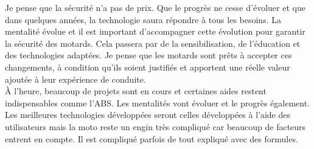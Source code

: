 
Je pense que la sécurité n'a pas de prix. Que le progrès ne cesse d'évoluer et que dans quelques années, la technologie saura répondre à tous les besoins. La mentalité évolue et il est important d'accompagner cette évolution pour garantir la sécurité des motards. Cela passera par de la sensibilisation, de l'éducation et des technologies adaptées. Je pense que les motards sont prêts à accepter ces changements, à condition qu'ils soient justifiés et apportent une réelle valeur ajoutée à leur expérience de conduite.\\
À l'heure, beaucoup de projets sont en cours et certaines aides restent indispensables comme l'ABS. Les mentalités vont évoluer et le progrès également. Les meilleures technologies développées seront celles développées à l'aide des utilisateurs mais la moto reste un engin très compliqué car beaucoup de facteurs entrent en compte. Il est compliqué parfois de tout expliqué avec des formules.